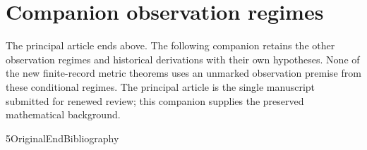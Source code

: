 

\appendix
\section*{Companion observation regimes}
The principal article ends above. The following companion retains the
other observation regimes and historical derivations with their own
hypotheses. None of the new finite-record metric theorems uses an
unmarked observation premise from these conditional regimes. The
principal article is the single manuscript submitted for renewed
review; this companion supplies the preserved mathematical background.
















\let\VPreviousSection\section
\def\section#1{\let\section\VPreviousSection
\section{Convex twist suspensions: six conditional laws and four raw laws}}







\let\V85OriginalEndBibliography\endthebibliography
\def\endthebibliography{\V85OriginalEndBibliography}


